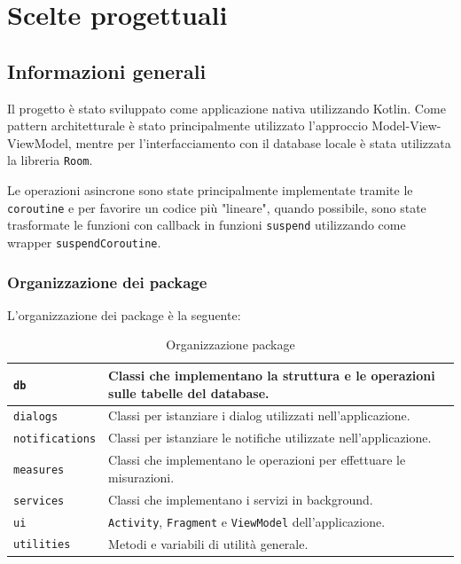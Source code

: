 \documentclass[11pt]{article}
\begin{document}
\section{Scelte progettuali}

\subsection{Informazioni generali}
Il progetto è stato sviluppato come applicazione nativa utilizzando Kotlin. 
Come pattern architetturale è stato principalmente utilizzato l'approccio Model-View-ViewModel, mentre per l'interfacciamento con il database locale è stata utilizzata la libreria \texttt{Room}.

Le operazioni asincrone sono state principalmente implementate tramite le \texttt{coroutine} e per favorire un codice più "lineare", quando possibile, sono state trasformate le funzioni con callback in funzioni \texttt{suspend} utilizzando come wrapper \texttt{suspendCoroutine}.

\subsubsection{Organizzazione dei package}
L'organizzazione dei package è la seguente:
\begin{table}[H]
  \centering
  \begin{tabular}{ | m{8em} | m{10cm} | } 
    \hline
    \texttt{db} & Classi che implementano la struttura e le operazioni sulle tabelle del database. \\ 
    \hline
    \texttt{dialogs} & Classi per istanziare i dialog utilizzati nell'applicazione. \\ 
    \hline
    \texttt{notifications} & Classi per istanziare le notifiche utilizzate nell'applicazione. \\ 
    \hline
    \texttt{measures} & Classi che implementano le operazioni per effettuare le misurazioni. \\ 
    \hline
    \texttt{services} & Classi che implementano i servizi in background. \\ 
    \hline
    \texttt{ui} & \texttt{Activity}, \texttt{Fragment} e \texttt{ViewModel} dell'applicazione. \\ 
    \hline
    \texttt{utilities} & Metodi e variabili di utilità generale. \\ 
    \hline
  \end{tabular}
  \caption{Organizzazione package}\label{table:packages}
\end{table}
\end{document}

